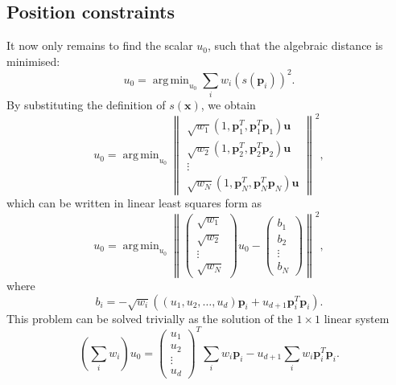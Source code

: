 \documentclass[final,3p,times,twocolumn]{elsarticle}
\DeclareMathOperator*{\argmin}{arg\,min}
\begin{document}
\subsection{Position constraints}
It now only remains to find the scalar $u_0$, such that the algebraic distance
is minimised:
\begin{equation}
 u_0 = \argmin_{u_0} \sum_i w_i \left( s(\textbf{p}_i) \right)^2.
\end{equation}
By substituting the definition of $s(\textbf{x})$, we obtain
\begin{equation}
 u_0 = \argmin_{u_0} \left\| \begin{array}{c}
			    \sqrt{w_1} \left( 1, \textbf{p}_1^T, \textbf{p}_1^T\textbf{p}_1 \right) \textbf{u} \\
			    \sqrt{w_2} \left( 1, \textbf{p}_2^T, \textbf{p}_2^T\textbf{p}_2 \right) \textbf{u} \\
                             \vdots \\
                             \sqrt{w_N} \left( 1, \textbf{p}_N^T, \textbf{p}_N^T\textbf{p}_N \right) \textbf{u}
                            \end{array}
 \right\| ^2 ,
\end{equation}
which can be written in linear least squares form as
\begin{equation}
  u_0 = \argmin_{u_0} \left\| \left( \begin{array}{c}
                             \sqrt{w_1} \\
                             \sqrt{w_2} \\
                             \vdots \\
                             \sqrt{w_N}
                            \end{array} \right)
                            u_0
                            -
                            \left( \begin{array}{c}
                             b_1 \\
                             b_2 \\
                             \vdots \\
                             b_N
                            \end{array} \right)
 \right\| ^2 ,
\end{equation}
where 
\begin{equation}
       b_i = - \sqrt{w_i} \left( (u_1, u_2, \ldots, u_d) \textbf{p}_i + u_{d+1} \textbf{p}_i^T \textbf{p}_i \right).
\end{equation}
This problem can be solved trivially as the solution of the $1 \times 1$ linear system
\begin{equation}
 \left( \sum_i w_i \right) u_0 = \left( \begin{array}{c}
         u_1 \\
         u_2 \\
         \vdots \\
         u_d
        \end{array} \right)^T \sum_i w_i \textbf{p}_i - u_{d+1} \sum_i w_i \textbf{p}_i^T \textbf{p}_i .
\end{equation}
\end{document}
